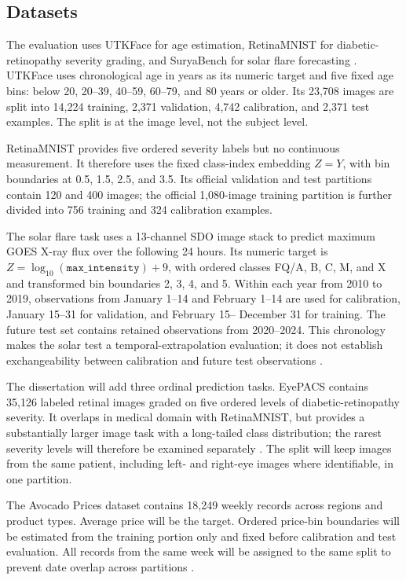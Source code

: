 \documentclass[12pt]{report}
\begin{document}
\subsection{Datasets}

The evaluation uses UTKFace for age estimation, RetinaMNIST for diabetic-retinopathy severity grading, and SuryaBench for solar flare forecasting \citep{utkface-zhifei2017cvpr,medmnistv2,roy2026suryabench}. UTKFace uses chronological age in years as its numeric target and five fixed age bins: below 20, 20--39, 40--59, 60--79, and 80 years or older. Its 23,708 images are split into 14,224 training, 2,371 validation, 4,742 calibration, and 2,371 test examples. The split is at the image level, not the subject level.

RetinaMNIST provides five ordered severity labels but no continuous measurement. It therefore uses the fixed class-index embedding \(Z=Y\), with bin boundaries at 0.5, 1.5, 2.5, and 3.5. Its official validation and test partitions contain 120 and 400 images; the official 1,080-image training partition is further divided into 756 training and 324 calibration examples.

The solar flare task uses a 13-channel SDO image stack to predict maximum GOES X-ray flux over the following 24 hours. Its numeric target is \(Z=\log_{10}(\texttt{max\_intensity})+9\), with ordered classes FQ/A, B, C, M, and X and transformed bin boundaries 2, 3, 4, and 5. Within each year from 2010 to 2019, observations from January 1--14 and February 1--14 are used for calibration, January 15--31 for validation, and February 15-- December 31 for training. The future test set contains retained observations from 2020--2024. This chronology makes the solar test a temporal-extrapolation evaluation; it does not establish exchangeability between calibration and future test observations \citep{roy2026suryabench,hong2026ocqr}.

The dissertation will add three ordinal prediction tasks. EyePACS contains 35,126 labeled retinal images graded on five ordered levels of diabetic-retinopathy severity. It overlaps in medical domain with RetinaMNIST, but provides a substantially larger image task with a long-tailed class distribution; the rarest severity levels will therefore be examined separately \citep{eyepacs_kaggle_2015,zhang2026mincps}. The split will keep images from the same patient, including left- and right-eye images where identifiable, in one partition.

The Avocado Prices dataset contains 18,249 weekly records across regions and product types. Average price will be the target. Ordered price-bin boundaries will be estimated from the training portion only and fixed before calibration and test evaluation. All records from the same week will be assigned to the same split to prevent date overlap across partitions \citep{kiggins2018avocado,zhang2026mincps}.
\end{document}

